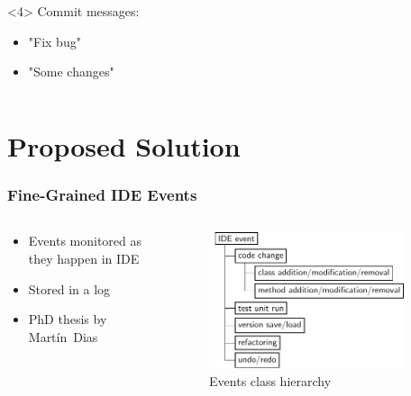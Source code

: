 \documentclass[aspectratio=169]{beamer}
\begin{document}
\begin{frame}[fragile]
\begin{columns}
\begin{column}{0.5\textwidth}
\begin{onlyenv}<4>
  Commit messages:
  \begin{itemize}
  \item "Fix bug"
  \item "Some changes"
  \end{itemize}
\end{onlyenv}

\end{column}

\end{columns}

\end{frame}

\section{Proposed Solution}

\begin{frame}[fragile]

\frametitle{Fine-Grained IDE Events}

\begin{columns}

\begin{column}{0.5\textwidth}

\begin{itemize}
\item Events monitored as they happen in IDE
\item Stored in a log
\item PhD thesis by Mart\'{i}n~Dias
\end{itemize}
\end{column}

\begin{column}{0.5\textwidth}

\begin{figure}
\begin{center}
\includegraphics[width=0.9\textwidth]{img/events_model_diagram.pdf}
\end{center}
\caption{Events class hierarchy}
\end{figure}

\end{column}

\end{columns}

\end{frame}
\end{document}
